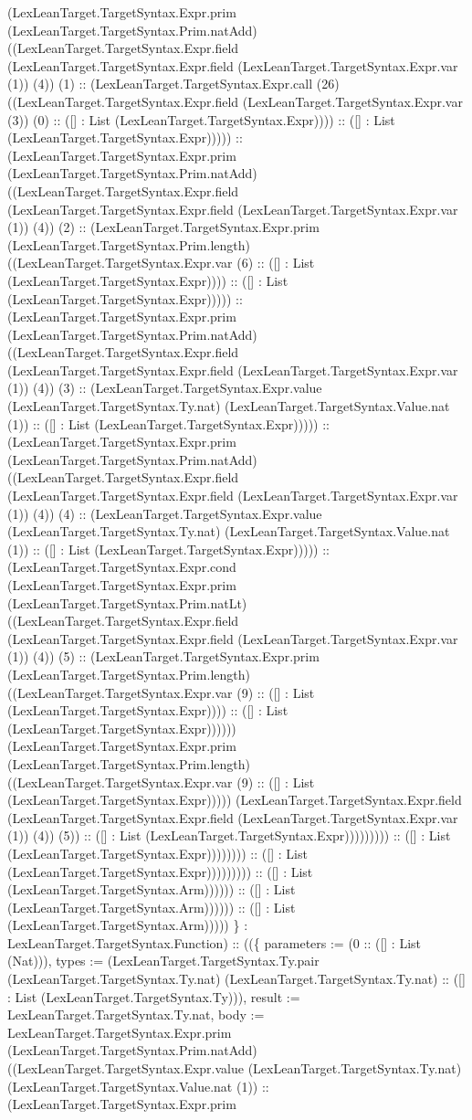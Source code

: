 \documentclass[11pt]{article}
\begin{document}
(LexLeanTarget.TargetSyntax.Expr.prim (LexLeanTarget.TargetSyntax.Prim.natAdd) ((LexLeanTarget.TargetSyntax.Expr.field (LexLeanTarget.TargetSyntax.Expr.field (LexLeanTarget.TargetSyntax.Expr.var (1)) (4)) (1) :: (LexLeanTarget.TargetSyntax.Expr.call (26) ((LexLeanTarget.TargetSyntax.Expr.field (LexLeanTarget.TargetSyntax.Expr.var (3)) (0) :: ([] : List (LexLeanTarget.TargetSyntax.Expr)))) :: ([] : List (LexLeanTarget.TargetSyntax.Expr))))) :: (LexLeanTarget.TargetSyntax.Expr.prim (LexLeanTarget.TargetSyntax.Prim.natAdd) ((LexLeanTarget.TargetSyntax.Expr.field (LexLeanTarget.TargetSyntax.Expr.field (LexLeanTarget.TargetSyntax.Expr.var (1)) (4)) (2) :: (LexLeanTarget.TargetSyntax.Expr.prim (LexLeanTarget.TargetSyntax.Prim.length) ((LexLeanTarget.TargetSyntax.Expr.var (6) :: ([] : List (LexLeanTarget.TargetSyntax.Expr)))) :: ([] : List (LexLeanTarget.TargetSyntax.Expr))))) :: (LexLeanTarget.TargetSyntax.Expr.prim (LexLeanTarget.TargetSyntax.Prim.natAdd) ((LexLeanTarget.TargetSyntax.Expr.field (LexLeanTarget.TargetSyntax.Expr.field (LexLeanTarget.TargetSyntax.Expr.var (1)) (4)) (3) :: (LexLeanTarget.TargetSyntax.Expr.value (LexLeanTarget.TargetSyntax.Ty.nat) (LexLeanTarget.TargetSyntax.Value.nat (1)) :: ([] : List (LexLeanTarget.TargetSyntax.Expr))))) :: (LexLeanTarget.TargetSyntax.Expr.prim (LexLeanTarget.TargetSyntax.Prim.natAdd) ((LexLeanTarget.TargetSyntax.Expr.field (LexLeanTarget.TargetSyntax.Expr.field (LexLeanTarget.TargetSyntax.Expr.var (1)) (4)) (4) :: (LexLeanTarget.TargetSyntax.Expr.value (LexLeanTarget.TargetSyntax.Ty.nat) (LexLeanTarget.TargetSyntax.Value.nat (1)) :: ([] : List (LexLeanTarget.TargetSyntax.Expr))))) :: (LexLeanTarget.TargetSyntax.Expr.cond (LexLeanTarget.TargetSyntax.Expr.prim (LexLeanTarget.TargetSyntax.Prim.natLt) ((LexLeanTarget.TargetSyntax.Expr.field (LexLeanTarget.TargetSyntax.Expr.field (LexLeanTarget.TargetSyntax.Expr.var (1)) (4)) (5) :: (LexLeanTarget.TargetSyntax.Expr.prim (LexLeanTarget.TargetSyntax.Prim.length) ((LexLeanTarget.TargetSyntax.Expr.var (9) :: ([] : List (LexLeanTarget.TargetSyntax.Expr)))) :: ([] : List (LexLeanTarget.TargetSyntax.Expr)))))) (LexLeanTarget.TargetSyntax.Expr.prim (LexLeanTarget.TargetSyntax.Prim.length) ((LexLeanTarget.TargetSyntax.Expr.var (9) :: ([] : List (LexLeanTarget.TargetSyntax.Expr))))) (LexLeanTarget.TargetSyntax.Expr.field (LexLeanTarget.TargetSyntax.Expr.field (LexLeanTarget.TargetSyntax.Expr.var (1)) (4)) (5)) :: ([] : List (LexLeanTarget.TargetSyntax.Expr))))))))) :: ([] : List (LexLeanTarget.TargetSyntax.Expr)))))))) :: ([] : List (LexLeanTarget.TargetSyntax.Expr))))))))) :: ([] : List (LexLeanTarget.TargetSyntax.Arm)))))) :: ([] : List (LexLeanTarget.TargetSyntax.Arm)))))) :: ([] : List (LexLeanTarget.TargetSyntax.Arm))))) \} : LexLeanTarget.TargetSyntax.Function) :: ((\{ parameters := (0 :: ([] : List (Nat))), types := (LexLeanTarget.TargetSyntax.Ty.pair (LexLeanTarget.TargetSyntax.Ty.nat) (LexLeanTarget.TargetSyntax.Ty.nat) :: ([] : List (LexLeanTarget.TargetSyntax.Ty))), result := LexLeanTarget.TargetSyntax.Ty.nat, body := LexLeanTarget.TargetSyntax.Expr.prim (LexLeanTarget.TargetSyntax.Prim.natAdd) ((LexLeanTarget.TargetSyntax.Expr.value (LexLeanTarget.TargetSyntax.Ty.nat) (LexLeanTarget.TargetSyntax.Value.nat (1)) :: (LexLeanTarget.TargetSyntax.Expr.prim 
\end{document}
